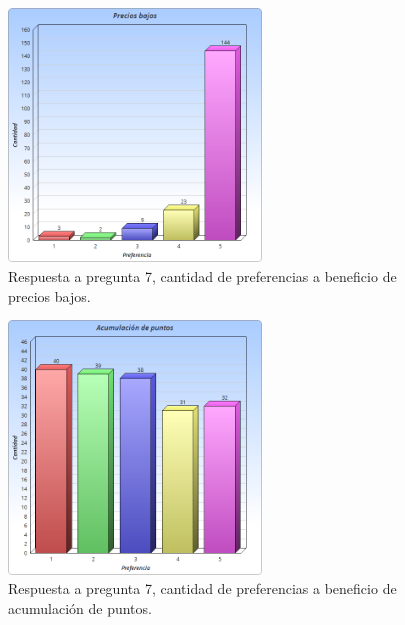 \begin{figure}[!htb]
  \centering
  \includegraphics[width=0.6\textwidth]{images/Graficos/graf_5_5.png}
  \caption[Gráfico pregunta 7, cantidad de preferencias a beneficio de precios bajos.]{Respuesta a pregunta 7, cantidad de preferencias a beneficio de precios bajos.}
  \label{fig:chart5.5}
\end{figure}

\begin{figure}[!htb]
  \centering
  \includegraphics[width=0.6\textwidth]{images/Graficos/graf_5_6.png}
  \caption[Gráfico pregunta 7, cantidad de preferencias a beneficio de acumulación de puntos.]{Respuesta a pregunta 7, cantidad de preferencias a beneficio de acumulación de puntos.}
  \label{fig:chart5.6}
\end{figure}

